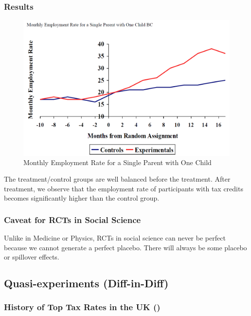             \subsubsection{Results}

                \begin{figure}[H]
                    \centering
                    \includegraphics[width=4.5in]{images/ch13/13_SSP_2.png}
                    \caption{Monthly Employment Rate for a Single Parent with One Child}
                \end{figure}

                The treatment/control groups are well balanced before the treatment. After treatment, we observe that the employment rate of participants with tax credits becomes significantly higher than the control group.

            \subsubsection{Caveat for RCTs in Social Science}

                Unlike in Medicine or Physics, RCTs in social science can never be perfect because we cannot generate a perfect placebo. There will always be some placebo or spillover effects.
                
        \subsection{Quasi-experiments (Diff-in-Diff)}

            \subsubsection{History of Top Tax Rates in the UK (\cite{brewer_means-testing_2010})}

